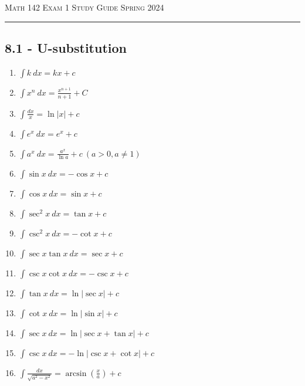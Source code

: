 \documentclass{article}
\begin{document}
\noindent
{\scshape Math 142} \hfill {\scshape Exam 1 Study Guide} \hfill {\scshape Spring 2024}

\smallskip

\hrule

\bigskip

\begin{multicols}{2}
\section*{8.1 - U-substitution}

{
\large

\begin{enumerate}

\item
$\int k~dx=kx+c$

\item
$\int x^n~dx=\frac{x^{n+1}}{n+1}+C$

\item
$\int \frac{dx}{x}=\ln|x|+c$

\item
$\int e^x~dx=e^x+c$

\item
$\int a^x~dx=\frac{a^x}{\ln a}+c~(a>0,a \neq 1)$

\item
$\int \sin x~dx=-\cos x+c$

\item
$\int \cos x~dx=\sin x+c$

\item
$\int \sec^2 x~dx=\tan x+c$

\item
$\int \csc^2 x~dx=-\cot x+c$

\item
$\int \sec x \tan x~dx=\sec x+c$

\item
$\int \csc x \cot x ~dx=-\csc x + c$

\item
$ \int \tan x ~dx = \ln |\sec x| +c$

\item
$\int \cot x ~dx = \ln| \sin x| + c$

\item
$\int \sec x ~dx = \ln|\sec x + \tan x| +c$

\item
$\int \csc x ~dx = -\ln|\csc x + \cot x| + c$

\item
$\int \frac{dx}{\sqrt{a^2-x^2}}=\arcsin \left( \frac{x}{a} \right) + c$


\end{enumerate}}
\end{multicols}
\end{document}
